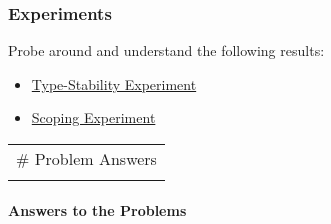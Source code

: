 \documentclass[11pt]{article}
\begin{document}
\subsubsection{Experiments}\label{experiments}

Probe around and understand the following results:

\begin{itemize}
\itemsep1pt\parskip0pt
\item
  \href{http://ucidatascienceinitiative.github.io/IntroToJulia/Html/TypeStabilityExperiment}{Type-Stability
  Experiment}
\item
  \href{http://ucidatascienceinitiative.github.io/IntroToJulia/Html/ScopingExperiment}{Scoping
  Experiment}
\end{itemize}

    \begin{longtable}[c]{@{}l@{}}
\toprule\addlinespace
\# Problem Answers
\\\addlinespace
\bottomrule
\end{longtable}

\paragraph{Answers to the Problems}\label{answers-to-the-problems}
\end{document}
